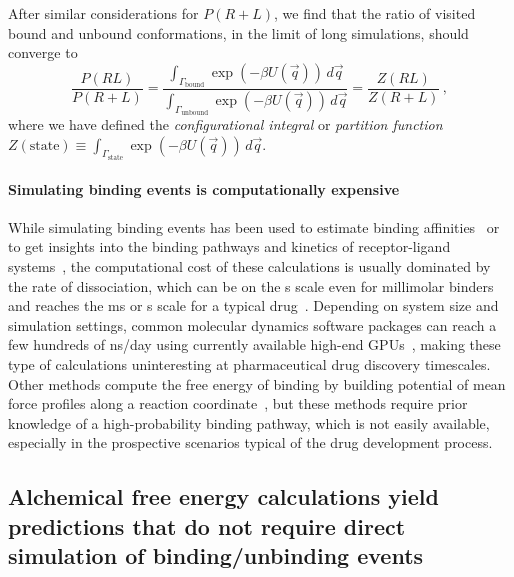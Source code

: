 \documentclass[9pt,bestpractices]{livecoms}
\begin{document}
After similar considerations for $P(R+L)$, we find that the ratio of visited bound and unbound conformations, in the limit of long simulations, should converge to
\begin{equation}\label{eq:bound-unbound-probability-ratio}
    \frac{P(RL)}{P(R+L)} = \frac{\int_{\Gamma_{\mathrm{bound}}} \exp\left( -\beta U(\vec{q}) \right) \, d\vec{q}}{\int_{\Gamma_{\mathrm{unbound}}} \exp\left( -\beta U(\vec{q}) \right) \, d\vec{q}} = \frac{Z(RL)}{Z(R+L)} \, ,
\end{equation}
where we have defined the \textit{configurational integral} or \textit{partition function} $Z(\mathrm{state}) \equiv \int_{\Gamma_{\mathrm{state}}} \exp\left(-\beta U(\vec{q})\right) \, d\vec{q}$.

\paragraph{Simulating binding events is computationally expensive}
While simulating binding events has been used to estimate binding affinities~\cite{jong2011determining,pan2017quantitative} or to get insights into the binding pathways and kinetics of receptor-ligand systems~\cite{teo2016adaptive,votapka2017seekr,doerr2014onthefly,plattner2015protein,dixon2018predicting}, the computational cost of these calculations is usually dominated by the rate of dissociation, which can be on the {\textmu}s scale even for millimolar binders~\cite{pan2017quantitative} and reaches the ms or s scale for a typical drug~\cite{basavapathruni2012conformational,hyre2006cooperative}.
Depending on system size and simulation settings, common molecular dynamics software packages can reach a few hundreds of ns/day using currently available high-end GPUs~\cite{eastman2017openmm,kutzner2019more}, making these type of calculations uninteresting at pharmaceutical drug discovery timescales.
Other methods compute the free energy of binding by building potential of mean force profiles along a reaction coordinate~\cite{woo2005calculationa,velez-vega2013overcoming,limongelli2013funnel,heinzelmann2017attachpullrelease}, but these methods require prior knowledge of a high-probability binding pathway, which is not easily available, especially in the prospective scenarios typical of the drug development process.

\subsection{Alchemical free energy calculations yield predictions that do not require direct simulation of binding/unbinding events}
\end{document}
